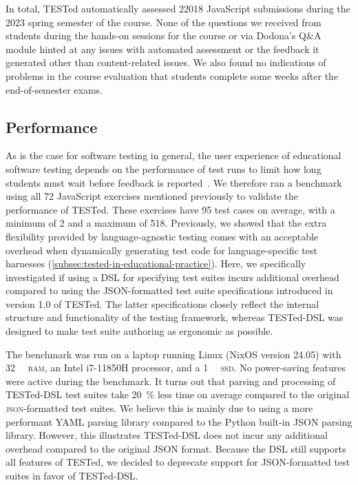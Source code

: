 \documentclass[../main]{subfiles}
\begin{document}
In total, TESTed automatically assessed \num{22018} JavaScript submissions during the 2023 spring semester of the course.
None of the questions we received from students during the hands-on sessions for the course or via Dodona's Q\&A module hinted at any issues with automated assessment or the feedback it generated other than content-related issues.
We also found no indications of problems in the course evaluation that students complete some weeks after the end-of-semester exams.

\subsection{Performance}\label{subsec:dsl-performance}

As is the case for software testing in general, the user experience of educational software testing depends on the performance of test runs to limit how long students must wait before feedback is reported~\autocite{sarsaSpeedingAutomatedAssessment2022}.
We therefore ran a benchmark using all 72 JavaScript exercises mentioned previously to validate the performance of TESTed.
These exercises have 95 test cases on average, with a minimum of 2 and a maximum of 518.
Previously, we showed that the extra flexibility provided by language-agnostic testing comes with an acceptable overhead when dynamically generating test code for language-specific test harnesses (\vref{subsec:tested-in-educational-practice}).
Here, we specifically investigated if using a DSL for specifying test suites incurs additional overhead compared to using the JSON-formatted test suite specifications introduced in version 1.0 of TESTed.
The latter specifications closely reflect the internal structure and functionality of the testing framework, whereas TESTed-DSL was designed to make test suite authoring as ergonomic as possible.

The benchmark was run on a laptop running Linux (NixOS version 24.05) with \qty{32}{\gibi\byte} \textsc{ram}, an Intel i7-11850H processor, and a \qty{1}{\tebi\byte} \textsc{ssd}.
No power-saving features were active during the benchmark.
It turns out that parsing and processing of TESTed-DSL test suites take \qty{20}{\percent} less time on average compared to the original \textsc{json}-formatted test suites.
We believe this is mainly due to using a more performant YAML parsing library compared to the Python built-in JSON parsing library.
However, this illustrates TESTed-DSL does not incur any additional overhead compared to the original JSON format.
Because the DSL still supports all features of TESTed, we decided to deprecate support for JSON-formatted test suites in favor of TESTed-DSL\@.
\end{document}
